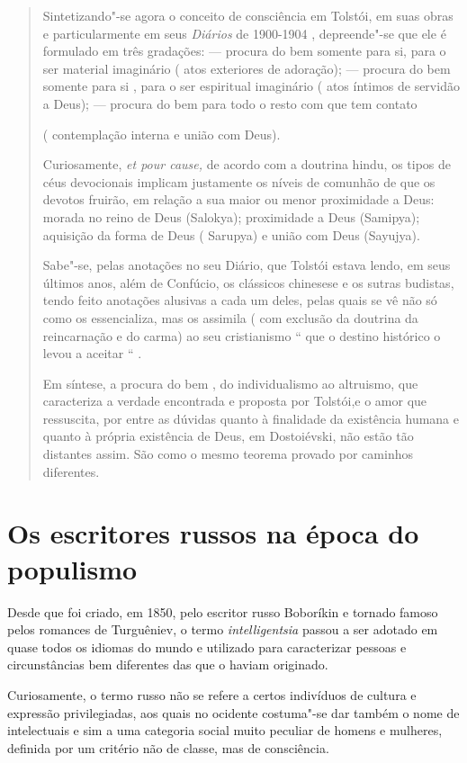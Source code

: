 \begin{quote}
Sintetizando"-se agora o conceito de consciência em Tolstói, em suas
obras e particularmente em seus \emph{Diários} de 1900-1904 ,
depreende"-se que ele é formulado em três gradações:  --- procura do bem
somente para si, para o ser material imaginário ( atos exteriores de
adoração);  --- procura do bem somente para si , para o ser espiritual
imaginário ( atos íntimos de servidão a Deus);  --- procura do bem
para todo o resto com que tem contato

( contemplação interna e união com Deus).

Curiosamente, \emph{et pour cause,} de acordo com a doutrina hindu, os
tipos de céus devocionais implicam justamente os níveis de comunhão de
que os devotos fruirão, em relação a sua maior ou menor proximidade a
Deus: morada no reino de Deus (Salokya); proximidade a Deus (Samipya);
aquisição da forma de Deus ( Sarupya) e união com Deus (Sayujya).

Sabe"-se, pelas anotações no seu Diário, que Tolstói estava lendo, em
seus últimos anos, além de Confúcio, os clássicos chinesese e os sutras
budistas, tendo feito anotações alusivas a cada um deles, pelas quais se
vê não só como os essencializa, mas os assimila ( com exclusão da
doutrina da reincarnação e do carma) ao seu cristianismo `` que o
destino histórico o levou a aceitar `` .

Em síntese, a procura do bem , do individualismo ao altruismo, que
caracteriza a verdade encontrada e proposta por Tolstói,e o amor que
ressuscita, por entre as dúvidas quanto à finalidade da existência
humana e quanto à própria existência de Deus, em Dostoiévski, não estão
tão distantes assim. São como o mesmo teorema provado por caminhos
diferentes.
\end{quote}

\chapter{Os escritores russos na época do populismo}

Desde que foi criado, em 1850, pelo escritor russo Boboríkin e tornado
famoso pelos romances de Turguêniev, o termo \emph{intelligentsia}
passou a ser adotado em quase todos os idiomas do mundo e utilizado para
caracterizar pessoas e circunstâncias bem diferentes das que o haviam
originado.

Curiosamente, o termo russo não se refere a certos indivíduos de cultura
e expressão privilegiadas, aos quais no ocidente costuma"-se dar também o
nome de intelectuais e sim a uma categoria social muito peculiar de
homens e mulheres, definida por um critério não de classe, mas de
consciência.

